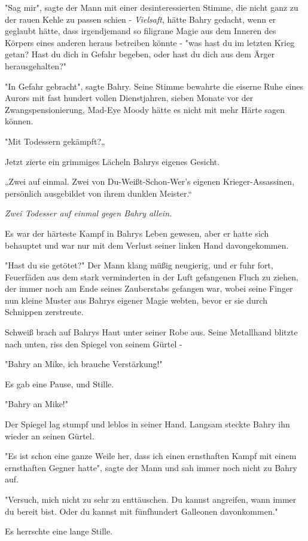 {"Sag mir", sagte der Mann mit einer desinteressierten Stimme, die nicht ganz zu der rauen Kehle zu passen schien - \emph{Vielsaft}, hätte Bahry gedacht, wenn er geglaubt hätte, dass irgendjemand so filigrane Magie aus dem Inneren des Körpers eines anderen heraus betreiben könnte - "was hast du im letzten Krieg getan? Hast du dich in Gefahr begeben, oder hast du dich aus dem Ärger herausgehalten?"

"In Gefahr gebracht", sagte Bahry. Seine Stimme bewahrte die eiserne Ruhe eines Aurors mit fast hundert vollen Dienstjahren, sieben Monate vor der Zwangspensionierung, Mad-Eye Moody hätte es nicht mit mehr Härte sagen können.

"Mit Todessern gekämpft?„

Jetzt zierte ein grimmiges Lächeln Bahrys eigenes Gesicht.

„Zwei auf einmal. Zwei von Du-Weißt-Schon-Wer's eigenen Krieger-Assassinen, persönlich ausgebildet von ihrem dunklen Meister.“

\emph{Zwei Todesser auf einmal gegen Bahry allein.}

Es war der härteste Kampf in Bahrys Leben gewesen, aber er hatte sich behauptet und war nur mit dem Verlust seiner linken Hand davongekommen.

"Hast du sie getötet?" Der Mann klang müßig neugierig, und er fuhr fort, Feuerfäden aus dem stark verminderten in der Luft gefangenen Fluch zu ziehen, der immer noch am Ende seines Zauberstabs gefangen war, wobei seine Finger nun kleine Muster aus Bahrys eigener Magie webten, bevor er sie durch Schnippen zerstreute.

Schweiß brach auf Bahrys Haut unter seiner Robe aus. Seine Metallhand blitzte nach unten, riss den Spiegel von seinem Gürtel -

"Bahry an Mike, ich brauche Verstärkung!"

Es gab eine Pause, und Stille.

"Bahry an Mike!"

Der Spiegel lag stumpf und leblos in seiner Hand. Langsam steckte Bahry ihn wieder an seinen Gürtel.

"Es ist schon eine ganze Weile her, dass ich einen ernsthaften Kampf mit einem ernsthaften Gegner hatte", sagte der Mann und sah immer noch nicht zu Bahry auf.

"Versuch, mich nicht zu sehr zu enttäuschen. Du kannst angreifen, wann immer du bereit bist. Oder du kannst mit fünfhundert Galleonen davonkommen."

Es herrschte eine lange Stille.

}
